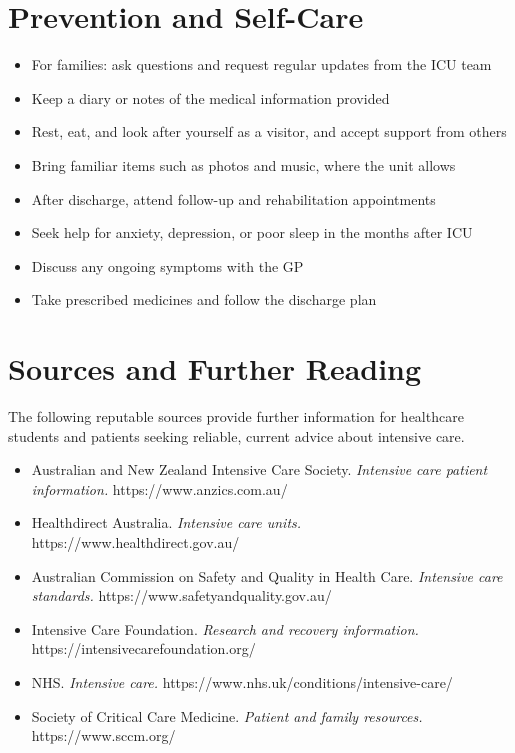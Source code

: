 \section*{Prevention and Self-Care}
\begin{itemize}
    \item For families: ask questions and request regular updates from the ICU team
    \item Keep a diary or notes of the medical information provided
    \item Rest, eat, and look after yourself as a visitor, and accept support from others
    \item Bring familiar items such as photos and music, where the unit allows
    \item After discharge, attend follow-up and rehabilitation appointments
    \item Seek help for anxiety, depression, or poor sleep in the months after ICU
    \item Discuss any ongoing symptoms with the GP
    \item Take prescribed medicines and follow the discharge plan
\end{itemize}

\section*{Sources and Further Reading}
The following reputable sources provide further information for healthcare students and patients seeking reliable, current advice about intensive care.
\begin{itemize}
    \item Australian and New Zealand Intensive Care Society. \textit{Intensive care patient information.} https://www.anzics.com.au/
    \item Healthdirect Australia. \textit{Intensive care units.} https://www.healthdirect.gov.au/
    \item Australian Commission on Safety and Quality in Health Care. \textit{Intensive care standards.} https://www.safetyandquality.gov.au/
    \item Intensive Care Foundation. \textit{Research and recovery information.} https://intensivecarefoundation.org/
    \item NHS. \textit{Intensive care.} https://www.nhs.uk/conditions/intensive-care/
    \item Society of Critical Care Medicine. \textit{Patient and family resources.} https://www.sccm.org/
\end{itemize}
